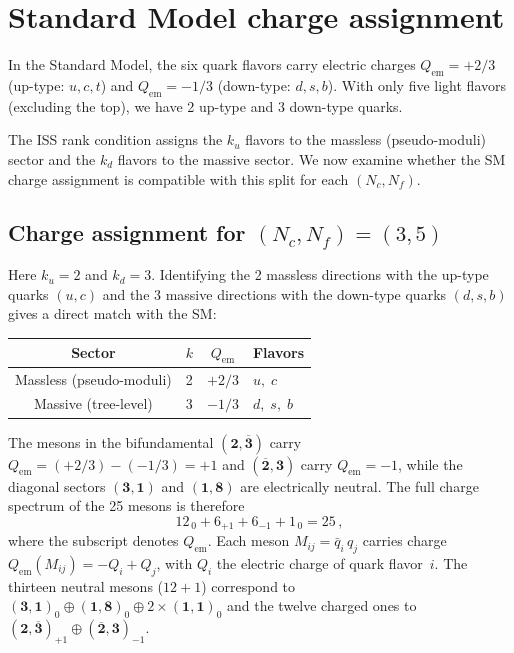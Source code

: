 \documentclass[11pt,a4paper]{article}
\newcommand{\Nf}{N_{\!f}}
\newcommand{\Nc}{N_{\!c}}
\newcommand{\rep}[1]{\mathbf{#1}}
\newcommand{\conjrep}[1]{\overline{\mathbf{#1}}}
\begin{document}
\section{Standard Model charge assignment}
\label{sec:charges}

In the Standard Model, the six quark flavors carry electric charges
$Q_{\text{em}} = +2/3$ (up-type: $u, c, t$) and
$Q_{\text{em}} = -1/3$ (down-type: $d, s, b$).
With only five light flavors (excluding the top), we have 2 up-type
and 3 down-type quarks.

The ISS rank condition assigns the $k_u$ flavors to the massless
(pseudo-moduli) sector and the $k_d$ flavors to the massive sector.
We now examine whether the SM charge assignment is compatible with
this split for each $(\Nc,\Nf)$.

\subsection{Charge assignment for $(\Nc,\Nf) = (3,5)$}

Here $k_u = 2$ and $k_d = 3$.
Identifying the 2 massless directions with the up-type quarks
$(u,c)$ and the 3 massive directions with the down-type quarks
$(d,s,b)$ gives a direct match with the SM:
\begin{center}
\begin{tabular}{cccl}
\toprule
Sector & $k$ & $Q_{\text{em}}$ & Flavors \\
\midrule
Massless (pseudo-moduli) & 2 & $+2/3$ & $u,\; c$ \\
Massive (tree-level) & 3 & $-1/3$ & $d,\; s,\; b$ \\
\bottomrule
\end{tabular}
\end{center}
The mesons in the bifundamental
$(\rep{2},\conjrep{3})$ carry
$Q_{\text{em}} = (+2/3) - (-1/3) = +1$ and
$(\conjrep{2},\rep{3})$ carry $Q_{\text{em}} = -1$,
while the diagonal sectors $(\rep{3},\rep{1})$ and
$(\rep{1},\rep{8})$ are electrically neutral.
The full charge spectrum of the 25 mesons is therefore
\begin{equation}
  12_{\,0} + 6_{+1} + 6_{-1} + 1_{\,0} = 25\,,
  \label{eq:meson-charges-35}
\end{equation}
where the subscript denotes $Q_{\text{em}}$.
Each meson $M_{ij} = \bar q_i\, q_j$ carries charge
$Q_{\text{em}}(M_{ij}) = -Q_i + Q_j$, with $Q_i$ the electric
charge of quark flavor~$i$.
The thirteen neutral mesons ($12 + 1$) correspond to
$(\rep{3},\rep{1})_0 \oplus (\rep{1},\rep{8})_0
\oplus 2\times(\rep{1},\rep{1})_0$
and the twelve charged ones to
$(\rep{2},\conjrep{3})_{+1} \oplus (\conjrep{2},\rep{3})_{-1}$.
\end{document}
